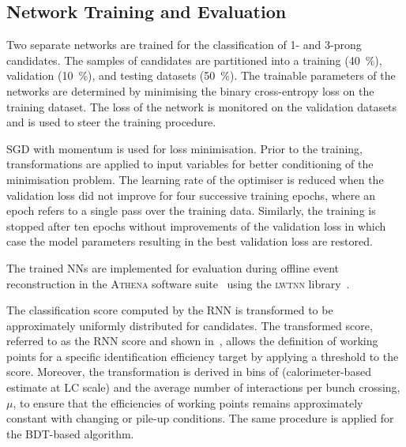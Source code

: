 \subsection{Network Training and Evaluation}

Two separate networks are trained for the classification of 1- and
3-prong \tauhadvis candidates. The samples of \tauhadvis candidates
are partitioned into a training (\SI{40}{\percent}), validation
(\SI{10}{\percent}), and testing datasets (\SI{50}{\percent}). The
trainable parameters of the networks are determined by minimising the
binary cross-entropy loss on the training dataset. The loss of the
network is monitored on the validation datasets and is used to steer
the training procedure.

SGD with momentum is used for loss minimisation. Prior to the training,
transformations are applied to input variables for better conditioning of the
minimisation problem. The learning rate of the optimiser is reduced when the
validation loss did not improve for four successive training epochs, where an
epoch refers to a single pass over the training data. Similarly, the training is
stopped after ten epochs without improvements of the validation loss in which
case the model parameters resulting in the best validation loss are restored.

The trained NNs are implemented for evaluation during offline
event reconstruction in the \textsc{Athena} software
suite~\cite{ATL-SOFT-PUB-2021-001} using the \textsc{lwtnn}
library~\cite{lwtnn}.

The classification score computed by the RNN \tauid is transformed to
be approximately uniformly distributed for \truetauhadvis
candidates. The transformed score, referred to as the RNN score and
shown in~, allows the definition of working
points for a specific \truetauhadvis identification efficiency target by
applying a threshold to the score. Moreover, the transformation is
derived in bins of \tauhadvis \pT (calorimeter-based \pT estimate at
LC scale) and the average number of interactions per bunch crossing,
$\mu$, to ensure that the \truetauhadvis efficiencies of working
points remains approximately constant with changing \tauhadvis \pT or
pile-up conditions. The same procedure is applied for the BDT-based
\tauid algorithm.

